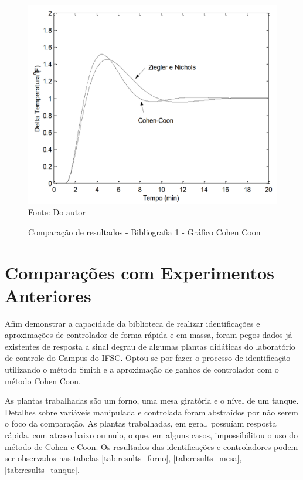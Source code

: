 \begin{figure}[H]
    \centering
    \caption{Comparação de resultados - Bibliografia 1 - Gráfico Cohen Coon}
    \includegraphics[scale=0.4]{figuras/bib_comp_1_ctrl_fig}
    \label{fig:bib_comp_1_ctrl_fig}
    \\
    \vspace{0cm}\hspace{0cm}\small{Fonte: Do autor}
\end{figure}


\section{Comparações com Experimentos Anteriores}

Afim demonstrar a capacidade da biblioteca de realizar identificações e aproximações de
controlador de forma rápida e em massa, foram pegos dados já existentes de resposta a sinal degrau de algumas plantas
didáticas do laboratório de controle do Campus do IFSC\@.
Optou-se por fazer o processo de identificação utilizando o método Smith e a aproximação de ganhos de controlador
com o método Cohen Coon.

As plantas trabalhadas são um forno, uma mesa giratória e o nível de um tanque.
Detalhes sobre variáveis manipulada e controlada foram abstraídos por não serem o foco da comparação.
As plantas trabalhadas, em geral, possuíam resposta rápida, com atraso baixo ou nulo, o que, em alguns casos,
impossibilitou o uso do método de Cohen e Coon.
Os resultados das identificações e controladores podem ser observados
nas tabelas \ref{tab:results_forno}, \ref{tab:results_mesa}, \ref{tab:results_tanque}.

